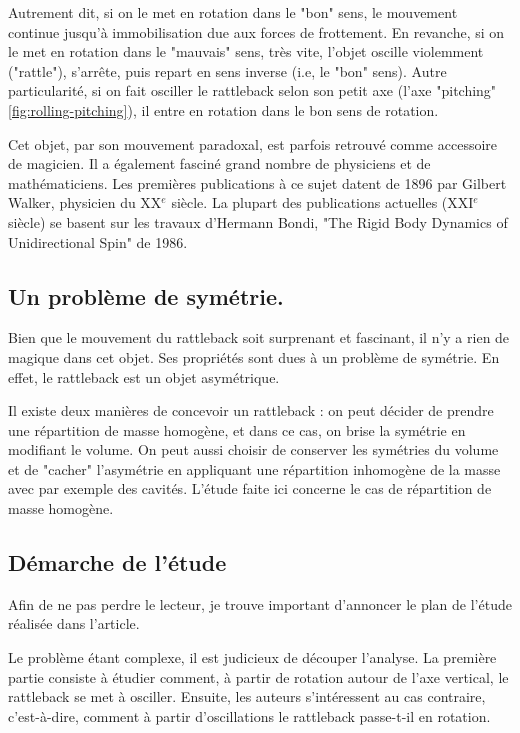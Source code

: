 \documentclass[12pt,a4paper]{article}
\begin{document}
	Autrement dit, si on le met en rotation dans le "bon" sens, le mouvement continue jusqu'à immobilisation due aux forces de frottement. En revanche, si on le met en rotation dans le "mauvais" sens, très vite, l'objet oscille violemment ("rattle"), s'arrête, puis repart en sens inverse (i.e, le "bon" sens). Autre particularité, si on fait osciller le rattleback selon son petit axe (l'axe "pitching" \autoref{fig:rolling-pitching}), il entre en rotation dans le bon sens de rotation.
	
	Cet objet, par son mouvement paradoxal, est parfois retrouvé comme accessoire de magicien.
	Il a également fasciné grand nombre de physiciens et de mathématiciens. Les premières publications à ce sujet datent de 1896 par Gilbert Walker, physicien du XX$^{e}$ siècle. La plupart des publications actuelles (XXI$^{e}$ siècle) se basent sur les travaux d'Hermann Bondi, "The Rigid Body Dynamics of Unidirectional Spin" de 1986.
	\subsection{Un problème de symétrie.}
	Bien que le mouvement du rattleback soit surprenant et fascinant, il n'y a rien de magique dans cet objet. Ses propriétés sont dues à un problème de symétrie. En effet, le rattleback est un objet asymétrique.
	
	Il existe deux manières de concevoir un rattleback : on peut décider de prendre une répartition de masse homogène, et dans ce cas, on brise la symétrie en modifiant le volume. On peut aussi choisir de conserver les symétries du volume et de "cacher" l'asymétrie en appliquant une répartition inhomogène de la masse avec par exemple des cavités. L'étude faite ici concerne le cas de répartition de masse homogène.
	
	\subsection{Démarche de l'étude}
	Afin de ne pas perdre le lecteur, je trouve important d'annoncer le plan de l'étude réalisée dans l'article.
	
	Le problème étant complexe, il est judicieux de découper l'analyse.
	La première partie consiste à étudier comment, à partir de rotation autour de l'axe vertical, le rattleback se met à osciller.
	Ensuite, les auteurs s'intéressent au cas contraire, c'est-à-dire, comment à partir d'oscillations le rattleback passe-t-il en rotation.
	
\end{document}
